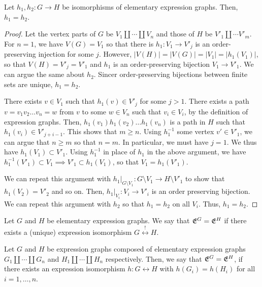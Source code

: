 \documentclass[./Thick_TQFTs_and_Quantum_Information.tex]{subfiles}
\begin{document}
\begin{thm}
Let $h_1, h_2 : G \to H$ be isomorphisms of elementary expression graphs. Then,
$h_1 = h_2$.
\end{thm}
\begin{proof}
Let the vertex parts of $G$ be $V_1 \amalg \cdots \amalg V_n$ and those of $H$
be $V'_1 \amalg \cdots V'_m$. For $n = 1$, we have $V(G) = V_1$ so that there is
$h_1 : V_1 \to V'_j$ is an order-preserving injection for some $j$. However,
$|V(H)| = |V(G)| = |V_1| = |h_1(V_1)|$, so that $V(H) = V'_j = V'_1$ and $h_1$
is an order-preserving bijection $V_1 \to V'_1$. We can argue the same about
$h_2$. Sincer order-preserving bijections between finite sets are unique,
$h_1 = h_2$.

There exists $v \in V_1$ such that $h_1(v) \in V'_j$ for some $j > 1$. There
exists a path $v = v_1v_2 \dots v_n = w$ from $v$ to some $w \in V_n$ such that
$v_i \in V_i$, by the definition of expression graphs. Then,
$h_1(v_1)h_1(v_2) \dots h_1(v_n)$ is a path in $H$ such that
$h_1(v_i) \in V'_{j + i - 1}$. This shows that $m \geq n$. Using $h_1^{-1}$ some
vertex $v' \in V'_1$, we can argue that $n \geq m$ so that $n = m$.
In particular, we must have $j = 1$. We thus have $h_1(V_1) \subset V'_1$. Using
$h_1^{-1}$ in place of $h_1$ in the above argument, we have
$h_1^{-1}(V'_1) \subset V_1 \implies V'_1 \subset h_1(V_1)$, so that
$V_1 = h_1(V'_1)$.

We can repeat this argument with
$h_1|_{G \setminus V_1} : G \setminus V_1 \to H \setminus V'_1$ to show that
$h_1(V_2) = V'_2$ and so on. Then, $h_1|_{V_i} : V_i \to V'_i$ is an order
preserving bijection. We can repeat this argument with $h_2$ so that
$h_1 = h_2$ on all $V_i$. Thus, $h_1 = h_2$.
\end{proof}

\begin{defn}
Let $G$ and $H$ be elementary expression graphs. We say that $\mathfrak{E}^{G} = \mathfrak{E}^{H}$
if there exists a (unique) expression isomorphism
$G \stackrel{!}{\longleftrightarrow} H$.
\end{defn}

\begin{defn}
Let $G$ and $H$ be expression graphs composed of elementary expression graphs
$G_1 \amalg \cdots \amalg G_n$ and $H_1 \amalg \cdots \amalg H_n$ respectively.
Then, we say that $\mathfrak{E}^{G} = \mathfrak{E}^{H}$, if there exists an expression isomorphism
$h : G \longleftrightarrow H$ with $h(G_i) = h(H_i)$ for all $i = 1, \dots, n$.
\end{defn}
\end{document}
